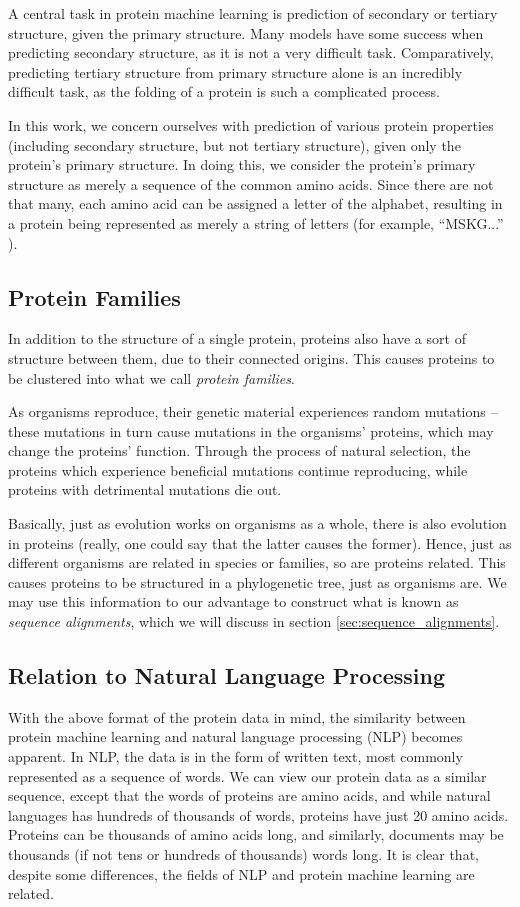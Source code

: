 A central task in protein machine learning is prediction of secondary or tertiary structure, given the primary structure. Many models have some success when predicting secondary structure, as it is not a very difficult task. Comparatively, predicting tertiary structure from primary structure alone is an incredibly difficult task, as the folding of a protein is such a complicated process.

In this work, we concern ourselves with prediction of various protein properties (including secondary structure, but not tertiary structure), given only the protein's primary structure. In doing this, we consider the protein's primary structure as merely a sequence of the common amino acids. Since there are not that many, each amino acid can be assigned a letter of the alphabet, resulting in a protein being represented as merely a string of letters (for example, ``MSKG...'' ).

\subsection{Protein Families}
\label{sec:protein_families}
In addition to the structure of a single protein, proteins also have a sort of structure between them, due to their connected origins. This causes proteins to be clustered into what we call \textit{protein families}.

As organisms reproduce, their genetic material experiences random mutations -- these mutations in turn cause mutations in the organisms' proteins, which may change the proteins' function. Through the process of natural selection, the proteins which experience beneficial mutations continue reproducing, while proteins with detrimental mutations die out.

Basically, just as evolution works on organisms as a whole, there is also evolution in proteins (really, one could say that the latter causes the former). Hence, just as different organisms are related in species or families, so are proteins related. This causes proteins to be structured in a phylogenetic tree, just as organisms are. We may use this information to our advantage to construct what is known as \textit{sequence alignments}, which we will discuss in section \ref{sec:sequence_alignments}.

\subsection{Relation to Natural Language Processing}
With the above format of the protein data in mind, the similarity between protein machine learning and natural language processing (NLP) becomes apparent. In NLP, the data is in the form of written text, most commonly represented as a sequence of words. We can view our protein data as a similar sequence, except that the words of proteins are amino acids, and while natural languages has hundreds of thousands of words, proteins have just 20 amino acids. Proteins can be thousands of amino acids long, and similarly, documents may be thousands (if not tens or hundreds of thousands) words long. It is clear that, despite some differences, the fields of NLP and protein machine learning are related.

